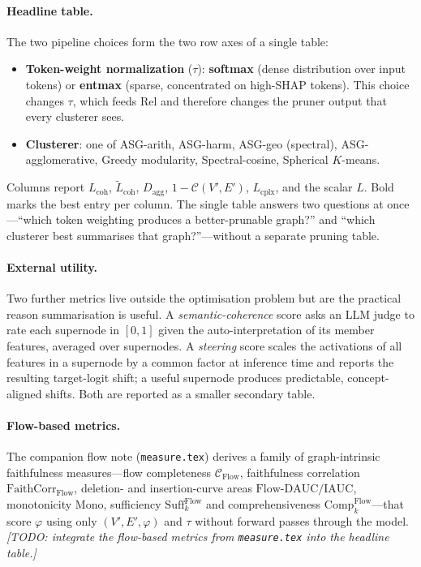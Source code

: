 \paragraph{Headline table.}
The two pipeline choices form the two row axes of a single table:
\begin{itemize}[leftmargin=*,topsep=2pt,itemsep=1pt]
\item \textbf{Token-weight normalization} ($\tau$): \textbf{softmax}
(dense distribution over input tokens) or \textbf{entmax} (sparse,
concentrated on high-SHAP tokens). This choice changes $\tau$, which
feeds $\mathrm{Rel}$ and therefore changes the pruner output that every
clusterer sees.
\item \textbf{Clusterer}: one of ASG-arith, ASG-harm, ASG-geo (spectral),
ASG-agglomerative, Greedy modularity, Spectral-cosine, Spherical
$K$-means.
\end{itemize}
Columns report $L_{\text{coh}}$, $\tilde{L}_{\text{coh}}$,
$D_{\text{agg}}$, $1 - \mathcal{C}(V', E')$, $L_{\text{cplx}}$, and the
scalar $L$. Bold marks the best entry per column. The single table
answers two questions at once---``which token weighting produces a
better-prunable graph?'' and ``which clusterer best summarises that
graph?''---without a separate pruning table.

\paragraph{External utility.}
Two further metrics live outside the optimisation problem but are the
practical reason summarisation is useful. A \emph{semantic-coherence}
score asks an LLM judge to rate each supernode in $[0, 1]$ given the
auto-interpretation of its member features, averaged over supernodes. A
\emph{steering} score scales the activations of all features in a
supernode by a common factor at inference time and reports the
resulting target-logit shift; a useful supernode produces predictable,
concept-aligned shifts. Both are reported as a smaller secondary
table.

\paragraph{Flow-based metrics.}
The companion flow note (\texttt{measure.tex}) derives a family of
graph-intrinsic faithfulness measures---flow completeness
$\mathcal{C}_{\mathrm{Flow}}$, faithfulness correlation
$\mathrm{FaithCorr}_{\mathrm{Flow}}$, deletion- and insertion-curve
areas $\mathrm{Flow}\text{-}\mathrm{DAUC}/\mathrm{IAUC}$, monotonicity
$\mathrm{Mono}$, sufficiency $\mathrm{Suff}_k^{\mathrm{Flow}}$ and
comprehensiveness $\mathrm{Comp}_k^{\mathrm{Flow}}$---that score
$\varphi$ using only $(V', E', \varphi)$ and $\tau$ without forward
passes through the model. \textit{[TODO: integrate the flow-based
metrics from \texttt{measure.tex} into the headline table.]}

